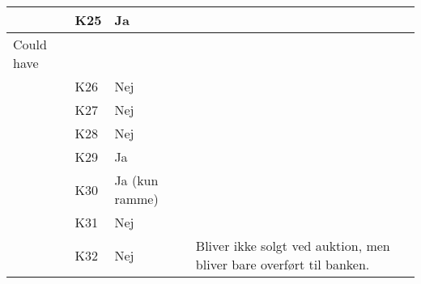\documentclass[class=article, crop=false]{standalone}
\begin{document}
\begin{table}[]
\begin{tabular}{|l|l|l|l|}
            & K25            & Ja                 &                                                                                                                                                                                                    \\ \hline
            Could have      &                &                    &                                                                                                                                                                                                    \\ \hline
            & K26            & Nej                &                                                                                                                                                                                                    \\ \hline
            & K27            & Nej                &                                                                                                                                                                                                    \\ \hline
            & K28            & Nej                &                                                                                                                                                                                                    \\ \hline
            & K29            & Ja                 &                                                                                                                                                                                                    \\ \hline
            & K30            & Ja (kun ramme)     &                                                                                                                                                                                                    \\ \hline
            & K31            & Nej                &                                                                                                                                                                                                    \\ \hline
            & K32            & Nej                & Bliver ikke solgt ved auktion, men bliver bare overført til banken.                                                                                                                                \\ \hline

\end{tabular}
\end{table}
\end{document}

